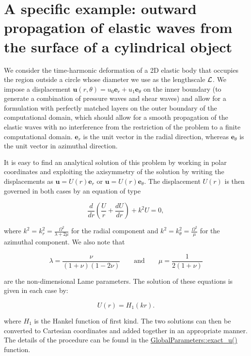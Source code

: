  

\hypertarget{index_test}{}\section{A specific example\+: outward propagation of elastic waves from the surface of a cylindrical object}\label{index_test}
We consider the time-\/harmonic deformation of a 2D elastic body that occupies the region outside a circle whose diameter we use as the lengthscale $ \cal L $. We impose a displacement $ {\mathbf{u}}(r,\theta)= u_0 {\mathbf{e}}_r + u_1 {\mathbf{e}}_{\theta} $ on the inner boundary (to generate a combination of pressure waves and shear waves) and allow for a formulation with perfectly matched layers on the outer boundary of the computational domain, which should allow for a smooth propagation of the elastic waves with no interference from the restriction of the problem to a finite computational domain. $ {\mathbf{e}}_r $ is the unit vector in the radial direction, whereas $ {\mathbf{e}}_{\theta} $ is the unit vector in azimuthal direction.

It is easy to find an analytical solution of this problem by working in polar coordinates and exploiting the axisymmetry of the solution by writing the displacements as $ \displaystyle {\mathbf{u}} = U(r) {\mathbf{e}}_r $ or $ \displaystyle {\mathbf{u}} = U(r) {\mathbf{e}}_{\theta} $. The displacement $ U(r) $ is then governed in both cases by an equation of type \begin{center} \[ \frac{d}{d r}\left(\frac{U}{r}+\frac{dU}{dr}\right) + k^2 U=0, \] \end{center}  where $ \displaystyle k^2 = k_{r}^2= \frac{\Omega^2}{\lambda+2\mu}$ for the radial component and $ \displaystyle k^2 = k_{\theta}^2= \frac{\Omega^2}{\mu}$ for the azimuthal component. We also note that \begin{center} \[ \lambda = \frac{\nu}{(1+\nu)(1-2\nu)} \qquad \textrm{and} \qquad \mu = \frac{1}{2(1+\nu)} \] \end{center}  are the non-\/dimensional Lame parameters. The solution of these equations is given in each case by\+: \begin{center} \[ U(r) = H_1(kr). \] \end{center}  where $ H_1 $ is the Hankel function of first kind. The two solutions can then be converted to Cartesian coordinates and added together in an appropriate manner. The details of the procedure can be found in the {\ttfamily  \hyperlink{namespaceGlobal__Parameters_a97162dba4bd29a15067b9c9bbe53c754}{Global\+Parameters\+::exact\+\_\+u()} } function.

